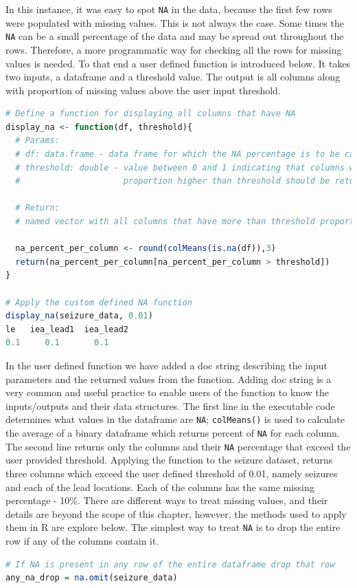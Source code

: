 In this instance, it was easy to spot \verb|NA| in the data, because the first few rows were populated with missing values. This is not always the case. Some times the \verb|NA| can be a small percentage of the data and may be spread out throughout the rows. Therefore, a more programmatic way for checking all the rows for missing values is needed. To that end a user defined function is introduced below. It takes two inputs, a dataframe and a threshold value. The output is all columns along with proportion of missing values above the user input threshold.
\begin{lstlisting}[language=R]
# Define a function for displaying all columns that have NA
display_na <- function(df, threshold){
  # Params:
  # df: data.frame - data frame for which the NA percentage is to be calculated
  # threshold: double - value between 0 and 1 indicating that columns with NA
  #                     proportion higher than threshold should be returned

  # Return:
  # named vector with all columns that have more than threshold proportion of values with NA

  na_percent_per_column <- round(colMeans(is.na(df)),3)
  return(na_percent_per_column[na_percent_per_column > threshold])
}

# Apply the custom defined NA function
display_na(seizure_data, 0.01)
le   iea_lead1  iea_lead2
0.1     0.1       0.1
\end{lstlisting}
In the user defined function we have added a doc string describing the input parameters and the returned values from the function. Adding doc string is a very common and useful practice to enable users of the function to know the inputs/outputs and their data structures. The first line in the executable code determines what values in the dataframe are \verb|NA|; \verb|colMeans()| is used to calculate the average of a binary dataframe which returns percent of \verb|NA| for each column. The second line returns only the columns and their \verb|NA| percentage that exceed the user provided threshold. Applying the function to the seizure dataset, returns three columns which exceed the user defined threshold of 0.01, namely seizures and each of the lead locations. Each of the columns has the same missing percentage - 10\%.
There are different ways to treat missing values, and their details are beyond the scope of this chapter, however, the methods used to apply them in R are explore below.
The simplest way to treat \verb|NA| is to drop the entire row if any of the columns contain it.
\begin{lstlisting}[language=R]
# If NA is present in any row of the entire dataframe drop that row
any_na_drop = na.omit(seizure_data)
\end{lstlisting}
